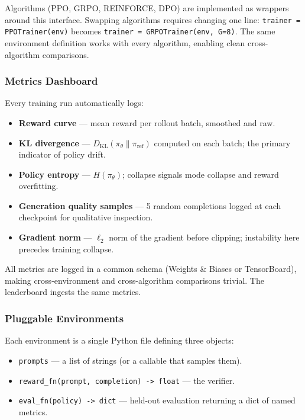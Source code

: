 Algorithms (PPO, GRPO, REINFORCE, DPO) are implemented as wrappers around this interface. Swapping algorithms requires changing one line: \texttt{trainer = PPOTrainer(env)} becomes \texttt{trainer = GRPOTrainer(env, G=8)}. The same environment definition works with every algorithm, enabling clean cross-algorithm comparisons.

\subsubsection{Metrics Dashboard}

Every training run automatically logs:

\begin{itemize}
  \item \textbf{Reward curve} --- mean reward per rollout batch, smoothed and raw.
  \item \textbf{KL divergence} --- $D_{\mathrm{KL}}(\pi_\theta \| \pi_{\mathrm{ref}})$ computed on each batch; the primary indicator of policy drift.
  \item \textbf{Policy entropy} --- $H(\pi_\theta)$; collapse signals mode collapse and reward overfitting.
  \item \textbf{Generation quality samples} --- 5 random completions logged at each checkpoint for qualitative inspection.
  \item \textbf{Gradient norm} --- $\ell_2$ norm of the gradient before clipping; instability here precedes training collapse.
\end{itemize}

All metrics are logged in a common schema (Weights \& Biases or TensorBoard), making cross-environment and cross-algorithm comparisons trivial. The leaderboard ingests the same metrics.

\subsubsection{Pluggable Environments}

Each environment is a single Python file defining three objects:

\begin{itemize}
  \item \texttt{prompts} --- a list of strings (or a callable that samples them).
  \item \texttt{reward\_fn(prompt, completion) -> float} --- the verifier.
  \item \texttt{eval\_fn(policy) -> dict} --- held-out evaluation returning a dict of named metrics.
\end{itemize}

